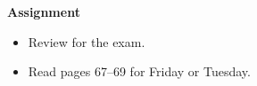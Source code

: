 


\noindent
{\bf Assignment}
\begin{itemize}
\item Review for the exam.
\item Read pages 67--69 for Friday or Tuesday.
\end{itemize}
